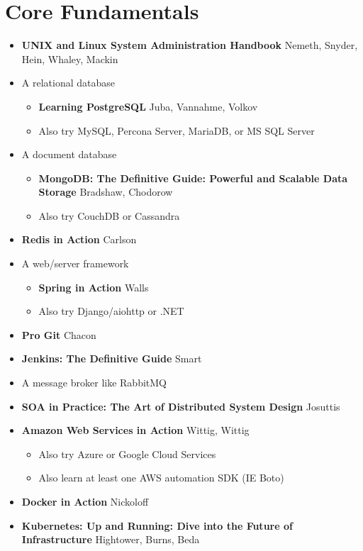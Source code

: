 \documentclass[12pt]{article}
\begin{document}
\section{Core Fundamentals}
\begin{itemize}
\item \textbf{UNIX and Linux System Administration Handbook} Nemeth, Snyder, Hein, Whaley, Mackin
\item A relational database
  \begin{itemize}
  \item \textbf{Learning PostgreSQL} Juba, Vannahme, Volkov
  \item Also try MySQL, Percona Server, MariaDB, or MS SQL Server
  \end{itemize}
\item A document database
  \begin{itemize}
  \item \textbf{MongoDB: The Definitive Guide: Powerful and Scalable Data Storage} Bradshaw, Chodorow
  \item Also try CouchDB or Cassandra
  \end{itemize}
\item \textbf{Redis in Action} Carlson
\item A web/server framework
  \begin{itemize}
  \item \textbf{Spring in Action} Walls
  \item Also try Django/aiohttp or .NET
  \end{itemize}
\item \textbf{Pro Git} Chacon
\item \textbf{Jenkins: The Definitive Guide} Smart
\item A message broker like RabbitMQ
\item \textbf{SOA in Practice: The Art of Distributed System Design} Josuttis
\item \textbf{Amazon Web Services in Action} Wittig, Wittig
  \begin{itemize}
  \item Also try Azure or Google Cloud Services
  \item Also learn at least one AWS automation SDK (IE Boto)
  \end{itemize}
\item \textbf{Docker in Action} Nickoloff
\item \textbf{Kubernetes: Up and Running: Dive into the Future of Infrastructure}  Hightower, Burns, Beda
  \begin{itemize}

\end{itemize}
\end{itemize}
\end{document}
